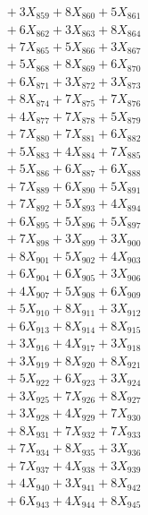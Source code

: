 \documentclass[a4paper,10pt]{article}
\begin{document}
{\begin{align}
&\;  + 3 X_{859} + 8 X_{860} + 5 X_{861} \\[0.3ex]
&\;  + 6 X_{862} + 3 X_{863} + 8 X_{864} \\[0.3ex]
&\;  + 7 X_{865} + 5 X_{866} + 3 X_{867} \\[0.3ex]
&\;  + 5 X_{868} + 8 X_{869} + 6 X_{870} \\[0.3ex]
&\;  + 6 X_{871} + 3 X_{872} + 3 X_{873} \\[0.3ex]
&\;  + 8 X_{874} + 7 X_{875} + 7 X_{876} \\[0.3ex]
&\;  + 4 X_{877} + 7 X_{878} + 5 X_{879} \\[0.5ex]\allowbreak
&\;  + 7 X_{880} + 7 X_{881} + 6 X_{882} \\[0.3ex]
&\;  + 5 X_{883} + 4 X_{884} + 7 X_{885} \\[0.3ex]
&\;  + 5 X_{886} + 6 X_{887} + 6 X_{888} \\[0.3ex]
&\;  + 7 X_{889} + 6 X_{890} + 5 X_{891} \\[0.3ex]
&\;  + 7 X_{892} + 5 X_{893} + 4 X_{894} \\[0.3ex]
&\;  + 6 X_{895} + 5 X_{896} + 5 X_{897} \\[0.3ex]
&\;  + 7 X_{898} + 3 X_{899} + 3 X_{900} \\[0.3ex]
&\;  + 8 X_{901} + 5 X_{902} + 4 X_{903} \\[0.3ex]
&\;  + 6 X_{904} + 6 X_{905} + 3 X_{906} \\[0.3ex]
&\;  + 4 X_{907} + 5 X_{908} + 6 X_{909} \\[0.5ex]\allowbreak
&\;  + 5 X_{910} + 8 X_{911} + 3 X_{912} \\[0.3ex]
&\;  + 6 X_{913} + 8 X_{914} + 8 X_{915} \\[0.3ex]
&\;  + 3 X_{916} + 4 X_{917} + 3 X_{918} \\[0.3ex]
&\;  + 3 X_{919} + 8 X_{920} + 8 X_{921} \\[0.3ex]
&\;  + 5 X_{922} + 6 X_{923} + 3 X_{924} \\[0.3ex]
&\;  + 3 X_{925} + 7 X_{926} + 8 X_{927} \\[0.3ex]
&\;  + 3 X_{928} + 4 X_{929} + 7 X_{930} \\[0.3ex]
&\;  + 8 X_{931} + 7 X_{932} + 7 X_{933} \\[0.3ex]
&\;  + 7 X_{934} + 8 X_{935} + 3 X_{936} \\[0.3ex]
&\;  + 7 X_{937} + 4 X_{938} + 3 X_{939} \\[0.5ex]\allowbreak
&\;  + 4 X_{940} + 3 X_{941} + 8 X_{942} \\[0.3ex]
&\;  + 6 X_{943} + 4 X_{944} + 8 X_{945} \\[0.3ex]

\end{align}}
\end{document}
